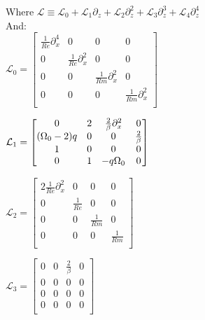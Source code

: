 \documentclass[letterpaper,12pt]{article}
\newcommand\reye{\mathrel{Re}}
\newcommand\reym{\mathrel{Rm}}
\begin{document}
Where $\mathcal{L} \equiv \mathcal{L}_0 + \mathcal{L}_1\partial_z + \mathcal{L}_2\partial_z^2 + \mathcal{L}_3\partial_z^3 + \mathcal{L}_4\partial_z^4$ \\

And: \\

$\mathcal{L}_0 = \left[\begin{matrix}
\frac{1}{\reye}\partial_x^4 & 0 & 0 & 0 \\
0 & \frac{1}{\reye}\partial_x^2 & 0 &0 \\
0 & 0 & \frac{1}{\reym}\partial_x^2 & 0 \\
0 & 0 & 0 & \frac{1}{\reym}\partial_x^2 \\ \end{matrix}\right] $ \\

\vspace{2mm}

$\mathcal{L}_1 = \left[\begin{matrix}
0 & 2 & \frac{2}{\beta}\partial_x^2 & 0 \\
(\Omega_0 - 2)q & 0 & 0 & \frac{2}{\beta} \\
1 & 0 & 0 & 0 \\
0 & 1 & -q\Omega_0 & 0 \\ \end{matrix}\right] \\$

\vspace{2mm}

$\mathcal{L}_2 = \left[\begin{matrix}
2\frac{1}{\reye} \partial_x^2 & 0 & 0 & 0 \\
0 & \frac{1}{\reye} & 0 & 0 \\
0 & 0 & \frac{1}{\reym} & 0 \\
0 & 0 & 0 & \frac{1}{\reym} \\ \end{matrix}\right]$

\vspace{2mm}

$\mathcal{L}_3 = \left[\begin{matrix}
0 & 0 & \frac{2}{\beta} & 0 \\
0 & 0 & 0 & 0 \\
0 & 0 & 0 & 0 \\
0 & 0 & 0 & 0 \\ \end{matrix} \right] $

\vspace{2mm}
\end{document}
